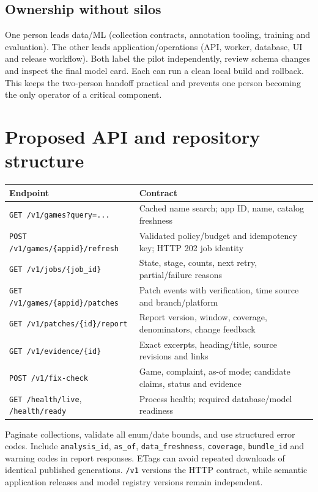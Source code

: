 \documentclass[10pt,letterpaper]{article}
\newcommand{\nextsection}[1]{\clearpage\section{#1}}
\begin{document}
\subsection{Ownership without silos}
One person leads data/ML (collection contracts, annotation tooling, training and evaluation). The other leads application/operations (API, worker, database, UI and release workflow). Both label the pilot independently, review schema changes and inspect the final model card. Each can run a clean local build and rollback. This keeps the two-person handoff practical and prevents one person becoming the only operator of a critical component.

\nextsection{Proposed API and repository structure}
\begin{tabularx}{\linewidth}{p{2.55in}Y}
\toprule
Endpoint & Contract \\
\midrule
\texttt{GET /v1/games?query=...} & Cached name search; app ID, name, catalog freshness \\
\texttt{POST /v1/games/\{appid\}/refresh} & Validated policy/budget and idempotency key; HTTP 202 job identity \\
\texttt{GET /v1/jobs/\{job\_id\}} & State, stage, counts, next retry, partial/failure reasons \\
\texttt{GET /v1/games/\{appid\}/patches} & Patch events with verification, time source and branch/platform \\
\texttt{GET /v1/patches/\{id\}/report} & Report version, window, coverage, denominators, change feedback \\
\texttt{GET /v1/evidence/\{id\}} & Exact excerpts, heading/title, source revisions and links \\
\texttt{POST /v1/fix-check} & Game, complaint, as-of mode; candidate claims, status and evidence \\
\texttt{GET /health/live}, \texttt{/health/ready} & Process health; required database/model readiness \\
\bottomrule
\end{tabularx}

Paginate collections, validate all enum/date bounds, and use structured error codes. Include \texttt{analysis\_id}, \texttt{as\_of}, \texttt{data\_freshness}, \texttt{coverage}, \texttt{bundle\_id} and warning codes in report responses. ETags can avoid repeated downloads of identical published generations. \texttt{/v1} versions the HTTP contract, while semantic application releases and model registry versions remain independent.
\end{document}
